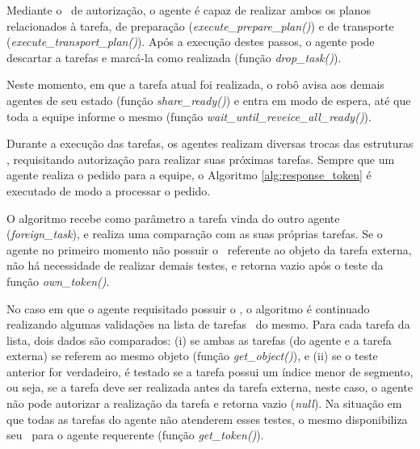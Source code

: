 Mediante o \token\ de autorização, o agente é capaz de realizar ambos os planos relacionados à tarefa, de preparação (\emph{execute\_prepare\_plan()}) e de transporte (\emph{execute\_transport\_plan()}). Após a execução destes passos, o agente pode descartar a tarefas e marcá-la como realizada (função \emph{drop\_task()}).

Neste momento, em que a tarefa atual foi realizada, o robô avisa aos demais agentes de seu estado (função \emph{share\_ready()}) e entra em modo de espera, até que toda a equipe informe o mesmo (função \emph{wait\_until\_reveice\_all\_ready()}).

Durante a execução das tarefas, os agentes realizam diversas trocas das estruturas \token, requisitando autorização para realizar suas próximas tarefas. Sempre que um agente realiza o pedido para a equipe, o Algoritmo \ref{alg:response_token} é executado de modo a processar o pedido.

O algoritmo recebe como parâmetro a tarefa vinda do outro agente (\emph{foreign\_task}), e realiza uma comparação com as suas próprias tarefas.
Se o agente no primeiro momento não possuir o \token\ referente ao objeto da tarefa externa, não há necessidade de realizar demais testes, e retorna vazio após o teste da função \emph{own\_token()}.

No caso em que o agente requisitado possuir o \token, o algoritmo é continuado realizando algumas validações na lista de tarefas \tasklist\ do mesmo.
Para cada tarefa da lista, dois dados são comparados:
(i) se ambas as tarefas (do agente e a tarefa externa) se referem ao mesmo objeto (função \emph{get\_object()}), e
(ii) se o teste anterior for verdadeiro, é testado se a tarefa possui um índice menor de segmento, ou seja, se a tarefa deve ser realizada antes da tarefa externa, neste caso, o agente não pode autorizar a realização da tarefa e retorna vazio (\emph{null}).
Na situação em que todas as tarefas do agente não atenderem esses testes, o mesmo disponibiliza seu \token\ para o agente requerente (função \emph{get\_token()}).


